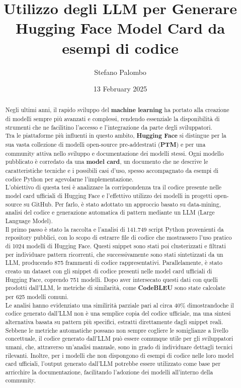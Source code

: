 \documentclass{article}
\title{Utilizzo degli LLM per Generare Hugging Face Model Card da esempi di codice}
\author{Stefano Palombo}
\date{13 February 2025}
\begin{document}
\maketitle

\begin{abstract}
Negli ultimi anni, il rapido sviluppo del \textbf{machine learning} ha portato alla creazione di modelli sempre più avanzati e complessi, rendendo essenziale la disponibilità di strumenti che ne facilitino l’accesso e l’integrazione da parte degli sviluppatori.\\ 
Tra le piattaforme più influenti in questo ambito, \textbf{Hugging Face} si distingue per la sua vasta collezione di modelli open-source pre-addestrati (\textbf{PTM}) e per una community attiva nello sviluppo e documentazione dei modelli stessi. Ogni modello pubblicato è corredato da una \textbf{model card}, un documento che ne descrive le caratteristiche tecniche e i possibili casi d’uso, spesso accompagnato da esempi di codice Python per agevolarne l’implementazione.\\
L’obiettivo di questa tesi è analizzare la corrispondenza tra il codice presente nelle model card ufficiali di Hugging Face e l’effettivo utilizzo dei modelli in progetti open-source su GitHub. Per farlo, è stato adottato un approccio basato su data-mining, analisi del codice e generazione automatica di pattern mediante un LLM (Large Language Model).\\
Il primo passo è stato la raccolta e l’analisi di 141.749 script Python provenienti da repository pubblici, con lo scopo di estrarre file di codice che mostrassero l’uso pratico di 1024 modelli di Hugging Face. Questi snippet sono stati poi clusterizzati e filtrati per individuare pattern ricorrenti, che successivamente sono stati sintetizzati da un LLM, producendo 875 frammenti di codice rappresentativi. Parallelamente, è stato creato un dataset con gli snippet di codice presenti nelle model card ufficiali di Hugging Face, coprendo 751 modelli. Dopo aver intersecato questi dati con quelli prodotti dall’LLM, le metriche di similarità, come \textbf{CodeBLEU} sono state calcolate per 625 modelli comuni.\\
Le analisi hanno evidenziato una similirità parziale pari al circa 40\% dimostrandoche il codice generato dall’LLM non è una semplice copia del codice ufficiale, ma una sintesi alternativa basata su pattern più specifici, estratti direttamente dagli snippet reali.
Sebbene le metriche automatiche possano non sempre cogliere le somiglianze a livello concettuale, il codice generato dall’LLM può essere comunque utile per gli sviluppatori umani, che, attraverso un’analisi manuale, sono in grado di individuare dettagli tecnici rilevanti. Inoltre, per i modelli che non dispongono di esempi di codice nelle loro model card ufficiali, l’output generato dall’LLM potrebbe essere utilizzato come base per arricchire la documentazione, facilitando l’adozione dei modelli all’interno della community.\\

\end{abstract}
\end{document}
